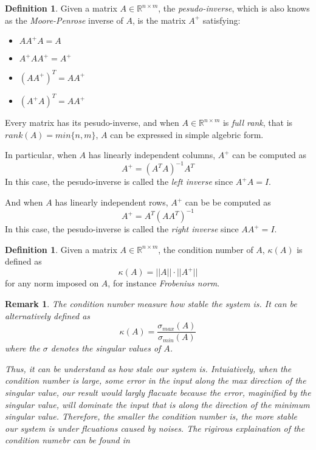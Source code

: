 \documentclass[12pt]{amsart}
\numberwithin{equation}{section}
\newtheorem{remark}[thm]{Remark}
\theoremstyle{definition}
\newtheorem{definition}[thm]{Definition}
\numberwithin{thm}{section}
\begin{document}
\begin{definition}
     Given a matrix $A \in \mathbb{R}^{n \times m}$, the \emph{pesudo-inverse},
     which is also knows as the \emph{Moore-Penrose} inverse of $A$, is the matrix
     $A^+$ satisfying:
     \begin{itemize}
          \item $A A^+ A = A$
          \item $A^+ A A^+ = A^+$
          \item $(A A^+)^T = A A^+$
          \item $(A^+ A)^T = A A^+$
        \end{itemize}
     Every matrix has its pesudo-inverse, and when $A \in \mathbb{R}^{n \times m}$ is \emph{full rank}, 
     that is $rank(A) = min\{n, m\}$, $A$ can be expressed in simple algebric form.
     
     In particular, when $A$ has linearly independent columns, $A^+$ can be computed as
     \begin{equation}
          A^+ = (A^T A)^{-1} A^T
     \end{equation}
     In this case, the pesudo-inverse is called the \emph{left inverse} since $A^+ A = I$.

     And when $A$ has linearly independent rows, $A^+$ can be be computed as
     \begin{equation}
          A^+ = A^T (A A^T)^{-1}
     \end{equation}
     In this case, the pesudo-inverse is called the \emph{right inverse} since $A A^+ = I$. 
\end{definition}

\begin{definition}
     Given a matrix $A \in \mathbb{R}^{n \times m}$, the condition number of $A$, $\kappa(A)$ is defined as
     \begin{equation}
          \kappa(A) = ||A|| \cdot ||A^+||
     \end{equation}
     for any norm imposed on $A$, for instance \emph{Frobenius norm}.
\end{definition}

\begin{remark}
     The condition number measure how stable the system is. It can be alternatively defined as
     \begin{equation}
          \kappa(A) = \frac{\sigma_{max} (A)}{\sigma_{min} (A)}
     \end{equation}
     where the $\sigma$ denotes the singular values of $A$.

     Thus, it can be understand as how stale our system is. 
     Intuiatively, when the condition number is large, some error in the input along the max direction of the singular value,
     our result would largly flacuate because the error, maginified by the singular value, will dominate the input that is along
     the direction of the minimum singular value. 
     Therefore, the smaller the condition number is, the more stable our system is under flcuations caused by noises.
     The rigirous explaination of the condition numebr can be found in \cite{Cheney:Kincaid}
\end{remark}
\end{document}
